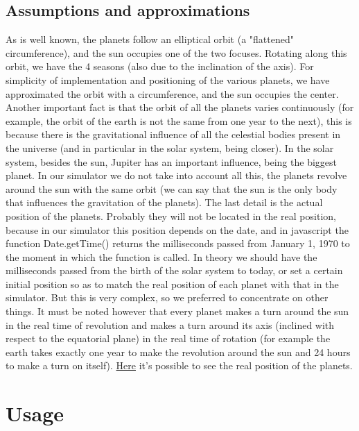 \documentclass{article}
\begin{document}
\subsection{Assumptions and approximations}
As is well known, the planets follow an elliptical orbit (a "flattened" circumference), and the sun occupies one of the two focuses. Rotating along this orbit, we have the 4 seasons (also due to the inclination of the axis). For simplicity of implementation and positioning of the various planets, we have approximated the orbit with a circumference, and the sun occupies the center.
\newline
Another important fact is that the orbit of all the planets varies continuously (for example, the orbit of the earth is not the same from one year to the next), this is because there is the gravitational influence of all the celestial bodies present in the universe (and in particular in the solar system, being closer). In the solar system, besides the sun, Jupiter has an important influence, being the biggest planet. In our simulator we do not take into account all this, the planets revolve around the sun with the same orbit (we can say that the sun is the only body that influences the gravitation of the planets).
\newline
The last detail is the actual position of the planets. Probably they will not be located in the real position, because in our simulator this position depends on the date, and in javascript the function Date.getTime() returns the milliseconds passed from January 1, 1970 to the moment in which the function is called. In theory we should have the milliseconds passed from the birth of the solar system to today, or set a certain initial position so as to match the real position of each planet with that in the simulator. But this is very complex, so we preferred to concentrate on other things. It must be noted however that every planet makes a turn around the sun in the real time of revolution and makes a turn around its axis (inclined with respect to the equatorial plane) in the real time of rotation (for example the earth takes exactly one year to make the revolution around the sun and 24 hours to make a turn on itself).
\newline
\href{https://theskylive.com/3dsolarsystem}{Here} it's possible to see the real position of the planets.

\section{Usage}
\end{document}
